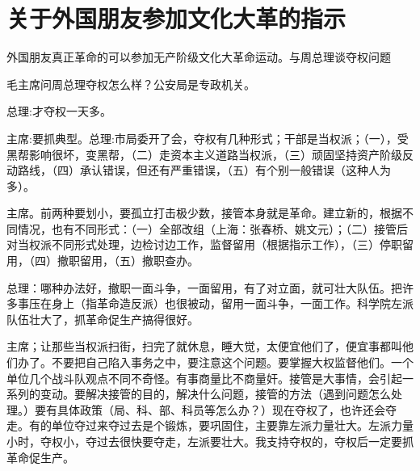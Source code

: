 \section[关于外国朋友参加文化大革的指示（一九六七年一月二十八日）]{关于外国朋友参加文化大革的指示}


外国朋友真正革命的可以参加无产阶级文化大革命运动。与周总理谈夺权问题


毛主席问周总理夺权怎么样？公安局是专政机关。

总理:才夺权一天多。

主席:要抓典型。总理:市局委开了会，夺权有几种形式；干部是当权派；（一），受黑帮影响很坏，变黑帮，（二）走资本主义道路当权派，（三）顽固坚持资产阶级反动路线，（四）承认错误，但还有严重错误，（五）有个别一般错误（这种人为多）。

主席。前两种要划小，要孤立打击极少数，接管本身就是革命。建立新的，根据不同情况，也有不同形式：（一）全部改组（上海：张春桥、姚文元）；（二）接管后对当权派不同形式处理，边检讨边工作，监督留用（根据指示工作），（三）停职留用，（四）撤职留用，（五）撤职查办。

总理：哪种办法好，撤职一面斗争，一面留用，有了对立面，就可壮大队伍。把许多事压在身上（指革命造反派）也很被动，留用一面斗争，一面工作。科学院左派队伍壮大了，抓革命促生产搞得很好。

主席；让那些当权派扫街，扫完了就休息，睡大觉，太便宜他们了，便宜事都叫他们办了。不要把自己陷入事务之中，要注意这个问题。要掌握大权监督他们。一个单位几个战斗队观点不同不奇怪。有事商量比不商量奸。接管是大事情，会引起一系列的变动。要解决接管的目的，解决什么问题，接管的方法（遇到问题怎么处理。）要有具体政策（局、科、部、科员等怎么办？）现在夺权了，也许还会夺走。有的单位夺过来夺过去是个锻炼，要巩固住，主要靠左派力量壮大。左派力量小时，夺权小，夺过去很快要夺走，左派要壮大。我支持夺权的，夺权后一定要抓革命促生产。


